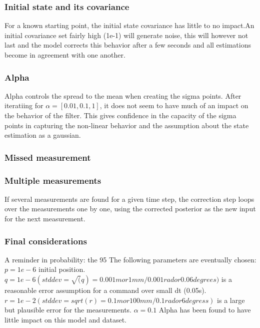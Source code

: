 \documentclass{article}
\begin{document}
\subsubsection{Initial state and its covariance}
For a known starting point, the initial state covariance has little to no impact.An initial covariance set fairly high (1e-1) will generate noise, this will however not last and the model corrects this behavior after a few seconds and all estimations become in agreement with one another.

\subsubsection{Alpha}
Alpha controls the spread to the mean when creating the sigma points. After iteratiing for $\alpha=[0.01, 0.1, 1]$, it does not seem to have much of an impact on the behavior of the filter. This gives confidence in the capacity of the sigma points in capturing the non-linear behavior and the assumption about the state estimation as a gaussian.

\subsubsection{Missed measurement}

\subsubsection{Multiple measurements}
If several measurements are found for a given time step, the correction step loops over the measurements one by one, using the corrected posterior as the new input for the next measurement.

\subsubsection{Final considerations}
A reminder in probability: the 95%
The following parameters are eventually chosen:
$p=1e-6$ initial position.
$q=1e-6 (stddev=\sqrt(q)=0.001m or 1mm / 0.001rad or 0.06degrees)$ is a reasonable error assumption for a command over small dt (0.05s). 
$r=1e-2 (stddev=sqrt(r)=0.1m or 100mm / 0.1rad or 6degress)$ is a large but plausible error for the measurements.
$\alpha=0.1$ Alpha has been found to have little impact on this model and dataset. 
\end{document}
